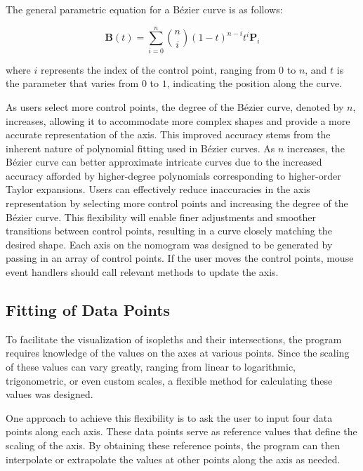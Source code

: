 \documentclass{l4proj}
\begin{document}
The general parametric equation for a Bézier curve is as follows: 

\begin{equation}
\mathbf{B}(t) = \sum_{i=0}^{n} \binom{n}{i} (1-t)^{n-i} t^i \mathbf{P}_i
\label{bezier-equation}
\end{equation}
\begin{flushleft}
where $i$ represents the index of the control point, ranging from $0$ to $n$, and $t$ is the parameter that varies from $0$ to $1$, indicating the position along the curve.
\end{flushleft}

As users select more control points, the degree of the Bézier curve, denoted by $n$, increases, allowing it to accommodate more complex shapes and provide a more accurate representation of the axis. This improved accuracy stems from the inherent nature of polynomial fitting used in Bézier curves. As $n$ increases, the Bézier curve can better approximate intricate curves due to the increased accuracy afforded by higher-degree polynomials corresponding to higher-order Taylor expansions. Users can effectively reduce inaccuracies in the axis representation by selecting more control points and increasing the degree of the Bézier curve. This flexibility will enable finer adjustments and smoother transitions between control points, resulting in a curve closely matching the desired shape.  Each axis on the nomogram was designed to be generated by passing in an array of control points. If the user moves the control points, mouse event handlers should call relevant methods to update the axis. 

\subsection{Fitting of Data Points}

To facilitate the visualization of isopleths and their intersections, the program requires knowledge of the values on the axes at various points. Since the scaling of these values can vary greatly, ranging from linear to logarithmic, trigonometric, or even custom scales, a flexible method for calculating these values was designed.

One approach to achieve this flexibility is to ask the user to input four data points along each axis. These data points serve as reference values that define the scaling of the axis. By obtaining these reference points, the program can then interpolate or extrapolate the values at other points along the axis as needed.
\end{document}
